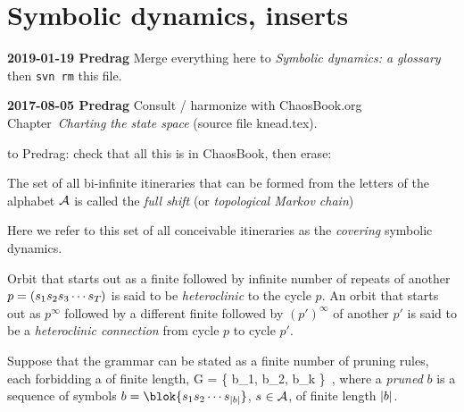 

\section{Symbolic dynamics, inserts}
\label{s-SymbDynDefs}

{\bf 2019-01-19 Predrag} Merge everything here to 
{\em Symbolic dynamics: a glossary} then \texttt{svn rm} this file.

{\bf 2017-08-05 Predrag}
Consult / harmonize with  ChaosBook.org Chapter~{\em Charting the state space} (source file knead.tex).



\bigskip

to Predrag: check that all this is in Chaos\-Book, then erase:

\bigskip


The set of all bi-infinite itineraries that can be formed from the
letters of the alphabet ${\cal A}$ is called the
{\em full shift} (or {\em topological Markov chain})

Here we refer to this set of all conceivable itineraries
as the {\em covering} symbolic dynamics.

Orbit that starts out as a finite {\brick} followed by infinite number of
repeats of another {\brick} $p = ({s_{1}} {s_{2}} {s_{3}} \cdots
{\ensuremath{s_{{T_{}}}}})$ is said to be {\em heteroclinic} to the cycle $p$. An
orbit that starts out as $p^{\infty}$ followed by a different finite
{\brick} followed by $(p')^{\infty}$ of another {\brick} $p'$ is said to be a
{\em heteroclinic connection} from cycle $p$ to cycle $p'$.



Suppose that
the grammar can be stated as a finite number of pruning rules, each
forbidding a {\brick} of finite length,
\beq
 {\cal G} = \left\{
        b_1, b_2, \cdots b_k
        \right\}
\,,
where a {\em pruned {\brick}} $b$ is a sequence of symbols
$b=\blok{ \Ssym{1} \Ssym{2} \cdots \Ssym{\cl{b}}}$,
 $\Ssym{} \in {\cal A}$,
of finite length ${|b|}$.


